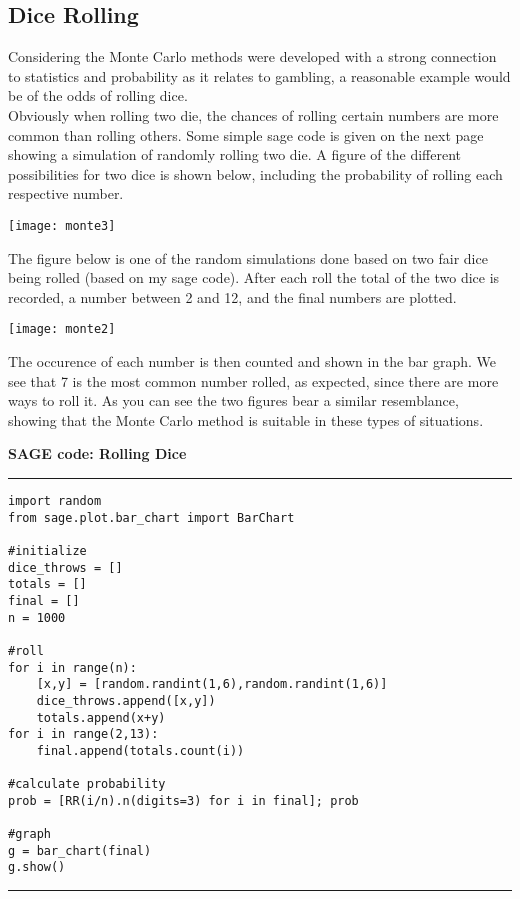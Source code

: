 \documentclass{article}
\begin{document}
\pagebreak

\subsection{Dice Rolling}

\hspace{4ex} Considering the Monte Carlo methods were developed with a strong connection to statistics and probability as it relates to gambling, a reasonable example would be of the odds of rolling dice. \\

Obviously when rolling two die, the chances of rolling certain numbers are more common than rolling others. Some simple sage code is given on the next page showing a simulation of randomly rolling two die. A figure of the different possibilities for two dice is shown below, including the probability of rolling each respective number.

\begin{center}
\texttt{[image: monte3]}
\end{center}

The figure below is one of the random simulations done based on two fair dice being rolled (based on my sage code). After each roll the total of the two dice is recorded, a number between 2 and 12, and the final numbers are plotted.

\begin{center}
\texttt{[image: monte2]}
\end{center}

The occurence of each number is then counted and shown in the bar graph. We see that 7 is the most common number rolled, as expected, since there are more ways to roll it.  As you can see the two figures bear a similar resemblance, showing that the Monte Carlo method is suitable in these types of situations.

\pagebreak

\noindent \textbf{SAGE code: Rolling Dice}

\noindent\rule{8cm}{0.4pt}
\begin{lstlisting}
import random
from sage.plot.bar_chart import BarChart

#initialize
dice_throws = []
totals = []
final = []
n = 1000

#roll
for i in range(n):
    [x,y] = [random.randint(1,6),random.randint(1,6)]
    dice_throws.append([x,y])
    totals.append(x+y)
for i in range(2,13):
    final.append(totals.count(i))

#calculate probability
prob = [RR(i/n).n(digits=3) for i in final]; prob

#graph
g = bar_chart(final)
g.show()
\end{lstlisting}
\noindent\rule{8cm}{0.4pt} \\
\end{document}
